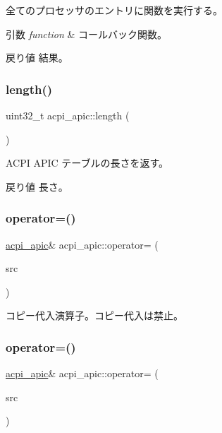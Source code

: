 全てのプロセッサのエントリに関数を実行する。 
\begin{DoxyParams}{引数}
{\em function} & コールバック関数。 \\
\hline
\end{DoxyParams}
\begin{DoxyReturn}{戻り値}
結果。 
\end{DoxyReturn}
\hypertarget{classacpi__apic_a2a84d72623015c66cc7aae8b154f6dd8}{}\label{classacpi__apic_a2a84d72623015c66cc7aae8b154f6dd8} 
\subsubsection{\texorpdfstring{length()}{length()}}
{\footnotesize\ttfamily uint32\+\_\+t acpi\+\_\+apic\+::length (\begin{DoxyParamCaption}{ }\end{DoxyParamCaption})}

A\+C\+PI A\+P\+IC テーブルの長さを返す。 \begin{DoxyReturn}{戻り値}
長さ。 
\end{DoxyReturn}
\hypertarget{classacpi__apic_a476b0daaeec3225c9a4f68114d276bd3}{}\label{classacpi__apic_a476b0daaeec3225c9a4f68114d276bd3} 
\subsubsection{\texorpdfstring{operator=()}{operator=()}\hspace{0.1cm}{\footnotesize\ttfamily [1/2]}}
{\footnotesize\ttfamily \hyperlink{classacpi__apic}{acpi\+\_\+apic}\& acpi\+\_\+apic\+::operator= (\begin{DoxyParamCaption}\item[{const \hyperlink{classacpi__apic}{acpi\+\_\+apic} \&}]{src }\end{DoxyParamCaption})\hspace{0.3cm}{\ttfamily [delete]}}

コピー代入演算子。コピー代入は禁止。 \hypertarget{classacpi__apic_acd939e20b14be73b59876556548c3ff5}{}\label{classacpi__apic_acd939e20b14be73b59876556548c3ff5} 
\subsubsection{\texorpdfstring{operator=()}{operator=()}\hspace{0.1cm}{\footnotesize\ttfamily [2/2]}}
{\footnotesize\ttfamily \hyperlink{classacpi__apic}{acpi\+\_\+apic}\& acpi\+\_\+apic\+::operator= (\begin{DoxyParamCaption}\item[{const \hyperlink{classacpi__apic}{acpi\+\_\+apic} \&\&}]{src }\end{DoxyParamCaption})\hspace{0.3cm}{\ttfamily [delete]}}

